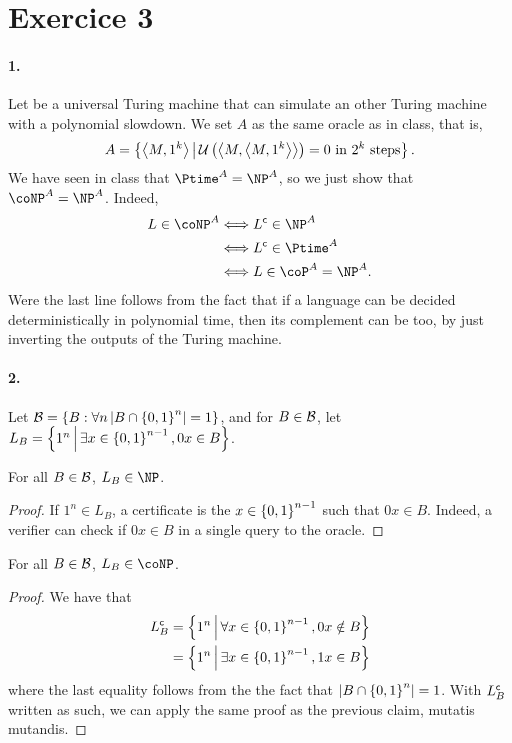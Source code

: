    \section*{Exercice 3}

    \paragraph{1.}
    Let \Uu be a universal Turing machine that can
    simulate an other Turing machine with a polynomial slowdown.
    We set $A$ as the same oracle as in class, that is, 
    \[
        A = \left\{  \left\langle M, 1^k \right\rangle  \, \middle| \, 
            \mathcal U\left(
                \left\langle M, \left\langle M, 1^k \right\rangle \right\rangle
            \right) = 0
            \text{ in } 2^k \text{ steps}
         \right\}.
    \]
    We have seen in class that $\Ptime^A = \NP^A$, so we just show that
    $\coNP^A = \NP^A$. Indeed, 
    \begin{align*}
        L \in \coNP^A 
        &\iff 
        \compl{L} \in \NP^A
        \\& \iff 
        \compl{L} \in \Ptime^A
        \\& \iff 
        L \in \coP^A = \NP^A.
    \end{align*}
    Were the last line follows from the fact that if a language can be 
    decided deterministically in polynomial time, then its complement
    can be too, by just inverting the outputs of the Turing machine.

    \paragraph{2.}
    Let $ \mathcal B = \left\{ B : \forall n \left| B \cap \left\{ 0, 1 \right\}^n \right| = 1 \right\} $,
    and for $B \in \mathcal B$, let $
        L_B = \left\{ 1^n \, \middle| \,  \exists x \in \left\{ 0, 1 \right\}^{n-1}, 0x \in B \right\}
    $.

    \begin{claim}
        For all $B \in \mathcal B$, $L_B \in \NP$.
    \end{claim}
    \begin{proof}
        If $1^n \in L_B$, a certificate is the $x \in \left\{ 0, 1 \right\}^{n-1}$
        such that $0x \in B$. Indeed, a verifier can check if $0x \in B$ in a 
        single query to the oracle.
    \end{proof}


    \begin{claim}
        For all $B \in \mathcal B$, $L_B \in \coNP$.
    \end{claim}
    \begin{proof}
        We have that \begin{align*}
            L_B^\mathsf{c} &=
            \left\{ 1^n \, \middle| \,  
                \forall x \in \left\{ 0, 1 \right\}^{n-1}, 0x \notin B
             \right\}
            \\&=
            \left\{ 1^n \, \middle| \,  
                \exists x \in \left\{ 0, 1 \right\}^{n-1}, 1x \in B
             \right\}
        \end{align*}
        where the last equality follows from the the fact that
        $\left| B \cap \left\{ 0, 1 \right\}^n \right| = 1$.
        With $L_B^\mathsf{c}$ written as such, we can apply the same proof as the previous
        claim, mutatis mutandis.
    \end{proof}

